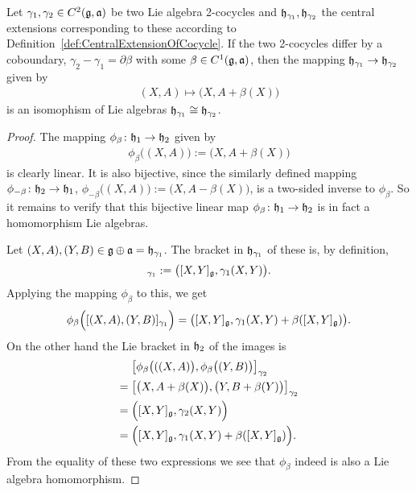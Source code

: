 \begin{lemma}
  \label{lem:CentralExtensionOfCocycleModCoboundary}
  \leanok
  Let $\gamma_1, \gamma_2 \in C^2(\mathfrak{g},\mathfrak{a})$ be two Lie algebra 2-cocycles
  and $\mathfrak{h}_{\gamma_1}, \mathfrak{h}_{\gamma_2}$ the central extensions corresponding
  to these according to Definition~\ref{def:CentralExtensionOfCocycle}.
  If the two 2-cocycles differ by a coboundary,
  $\gamma_2 - \gamma_1 = \partial \beta$ with some $\beta \in C^1(\mathfrak{g},\mathfrak{a})$,
  then the mapping $\mathfrak{h}_{\gamma_1} \to \mathfrak{h}_{\gamma_2}$ given by
  \begin{align*}
    (X,A) \mapsto \big( X, A + \beta(X) \big)
  \end{align*}
  is an isomophism of Lie algebras $\mathfrak{h}_{\gamma_1} \cong \mathfrak{h}_{\gamma_2}$.
\end{lemma}
\begin{proof}
  \leanok
  The mapping $\phi_\beta \colon \mathfrak{h}_1 \to \mathfrak{h}_2$ given by
  \begin{align*}
    \phi_\beta\big((X,A)\big) := \big( X, A + \beta(X) \big)
  \end{align*}
  is clearly linear. It is also bijective, since the similarly defined mapping
  $\phi_{-\beta} \colon \mathfrak{h}_2 \to \mathfrak{h}_1$,
  $\phi_{-\beta}\big((X,A)\big) := \big( X, A - \beta(X) \big)$,
  is a two-sided inverse to $\phi_\beta$.
  So it remains to verify that this bijective linear map
  $\phi_\beta \colon \mathfrak{h}_1 \to \mathfrak{h}_2$ is in fact a
  homomorphism Lie algebras.

  Let $(X, A), (Y, B) \in \mathfrak{g} \oplus \mathfrak{a} = \mathfrak{h}_{\gamma_1}$.
  The bracket in $\mathfrak{h}_{\gamma_1}$ of these is, by definition,
  \begin{align*}
    [(X, A), (Y, B)]_{\gamma_1} := \big([X, Y]_{\gLie}, \gamma_1(X, Y) \big) .
  \end{align*}
  Applying the mapping $\phi_\beta$ to this, we get
  \begin{align*}
    \phi_\beta \Big([(X, A), (Y, B)]_{\gamma_1} \Big)
      = \big([X, Y]_{\mathfrak{g}}, \gamma_1(X, Y) + \beta([X, Y]_{\mathfrak{g}}) \big) .
  \end{align*}
  On the other hand the Lie bracket in $\mathfrak{h}_2$ of the images is
  \begin{align*}
         & \big[ \phi_\beta\big(((X, A)\big), \phi_\beta\big((Y, B)\big) \big]_{\gamma_2} \\
    = \; & \big[ \big( X, A + \beta(X) \big), \big( Y, B + \beta(Y) \big) \big]_{\gamma_2} \\
    = \; & \Big( [X,Y]_{\mathfrak{g}} , \gamma_2(X,Y) \Big) \\
    = \; & \Big( [X,Y]_{\mathfrak{g}} , \gamma_1(X,Y) + \beta([X, Y]_{\mathfrak{g}}) \Big) .
  \end{align*}
  From the equality of these two expressions we see that $\phi_\beta$
  indeed is also a Lie algebra homomorphism.
\end{proof}

